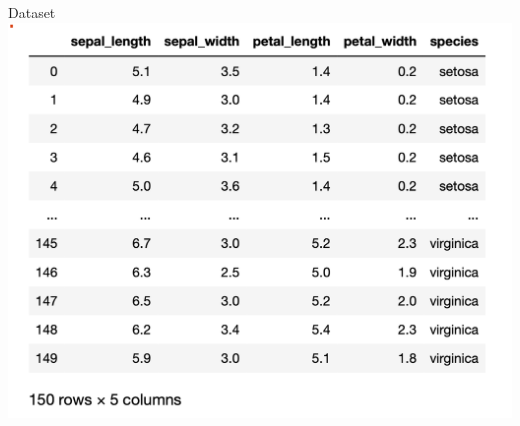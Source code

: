 \documentclass{beamer}
\begin{document}



\begin{frame}{Dataset }
  \includegraphics[scale=0.5]{dataset-iris.png}
\end{frame}


%         
\end{document}
